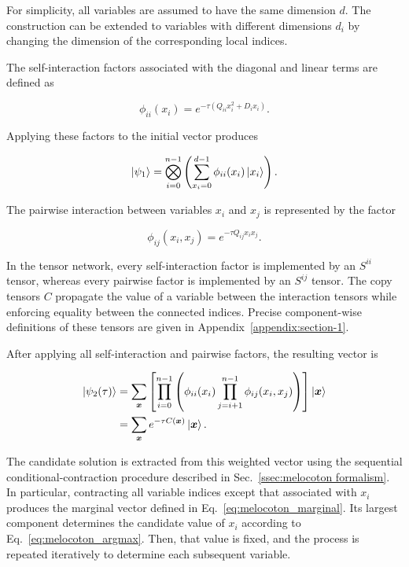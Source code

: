 \documentclass[%
 reprint,
 amsmath,amssymb,
 aps,
 pra,showkeys,
]{revtex4-2}
\begin{document}
For simplicity, all variables are assumed to have the same dimension
$d$. The construction can be extended to variables with different
dimensions $d_i$ by changing the dimension of the corresponding local
indices.

The self-interaction factors associated with the diagonal and linear terms are
defined as

\begin{equation}
\label{eq:qudo-unary-factor}
\phi_{ii}(x_i)
=
e^{-\tau\left(Q_{ii}x_i^2+D_ix_i\right)}.
\end{equation}

Applying these factors to the initial vector produces

\begin{equation}
\label{eq:qudo-unary-vector}
\ket{\psi_1}
=
\bigotimes_{i=0}^{n-1}
\left(
    \sum_{x_i=0}^{d-1}
    \phi_{ii}(x_i)\ket{x_i}
\right).
\end{equation}

The pairwise interaction between variables $x_i$ and $x_j$ is represented by the factor

\begin{equation}
\label{eq:qudo-pairwise-factor}
\phi_{ij}(x_i,x_j)
=
e^{-\tau Q_{ij}x_ix_j}.
\end{equation}

In the tensor network, every self-interaction factor is implemented by an
$S^{ii}$ tensor, whereas every pairwise factor is implemented by an
$S^{ij}$ tensor. The copy tensors $C$ propagate the value of a
variable between the interaction tensors while enforcing equality
between the connected indices. Precise component-wise definitions of
these tensors are given in Appendix~\ref{appendix:section-1}.

After applying all self-interaction and pairwise factors, the resulting vector is

\begin{equation}
\label{eq:qudo-final-vector}
\begin{aligned}
\ket{\psi_2(\tau)}
&=
\sum_{\boldsymbol{x}}
\left[
    \prod_{i=0}^{n-1}
    \left(
        \phi_{ii}(x_i)
        \prod_{j=i+1}^{n-1}
        \phi_{ij}(x_i,x_j)
    \right)
\right]
\ket{\boldsymbol{x}} \\
&=
\sum_{\boldsymbol{x}}
e^{-\tau C(\boldsymbol{x})}
\ket{\boldsymbol{x}}.
\end{aligned}
\end{equation}

The candidate solution is extracted from this weighted vector using the
sequential conditional-contraction procedure described in
Sec.~\ref{ssec:melocoton formalism}. In particular, contracting all variable
indices except that associated with $x_i$ produces the marginal vector
defined in Eq.~\eqref{eq:melocoton_marginal}. Its largest component
determines the candidate value of $x_i$ according to
Eq.~\eqref{eq:melocoton_argmax}. Then, that value is fixed, and the process is repeated iteratively to determine each subsequent variable.
\end{document}
